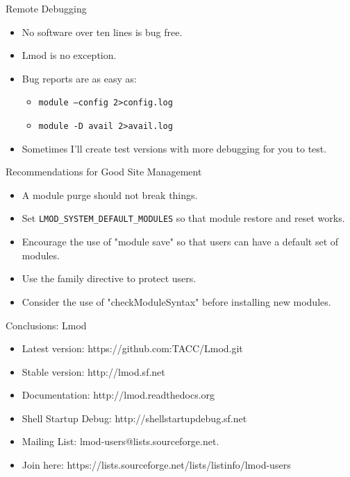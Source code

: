 \documentclass{beamer}
\begin{document}
\begin{frame}{Remote Debugging}
  \begin{itemize}
    \item No software over ten lines is bug free.
    \item Lmod is no exception.
    \item Bug reports are as easy as:
      \begin{itemize}
        \item \texttt{module --config  2\textgreater  config.log}
        \item \texttt{module -D avail  2\textgreater  avail.log}
      \end{itemize}
    \item Sometimes I'll create test versions with more debugging for
      you to test.
  \end{itemize}
\end{frame}

\begin{frame}{Recommendations for Good Site Management}
  \begin{itemize}
    \item A module purge should not break things.
    \item Set \texttt{LMOD\_SYSTEM\_DEFAULT\_MODULES} so that module
      restore and reset works.
    \item Encourage the use of "module save" so that users can have a
      default set of modules.
    \item Use the family directive to protect users.
    \item Consider the use of "checkModuleSyntax" before installing new modules.
  \end{itemize}
\end{frame}

\begin{frame}{Conclusions: Lmod}
  \begin{itemize}
    \item Latest version: https://github.com:TACC/Lmod.git
    \item Stable version: http://lmod.sf.net
    \item Documentation:  http://lmod.readthedocs.org
    \item Shell Startup Debug: http://shellstartupdebug.sf.net
    \item Mailing List:   lmod-users@lists.sourceforge.net.
    \item Join here: https://lists.sourceforge.net/lists/listinfo/lmod-users
  \end{itemize}
\end{frame}


%
\end{document}
